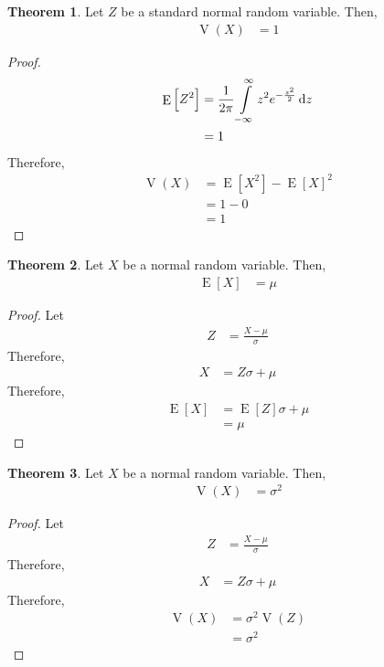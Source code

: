 \documentclass[titlepage, fleqn, a4paper, 12pt, twoside]{article}
\theoremstyle{definition}
\theoremstyle{theorem}
\newtheorem{theorem}{Theorem}
\DeclareMathOperator{\expct}{\mathrm{E}}
\DeclareMathOperator{\var}{\mathrm{V}}
\begin{document}
\begin{theorem}
	Let $Z$ be a standard normal random variable.
	Then,
	\begin{align*}
		\var(X) &= 1
	\end{align*}
\end{theorem}

\begin{proof}
	\begin{align*}
		\expct\left[ Z^2 \right] &= \frac{1}{2 \pi} \int\limits_{-\infty}^{\infty} z^2 e^{-\frac{z^2}{2}} \dif z\\
		&= 1
	\end{align*}
	Therefore,
	\begin{align*}
		\var(X) &= \expct\left[ X^2 \right] - \expct[X]^2\\
		&= 1 - 0\\
		&= 1
	\end{align*}
\end{proof}

\begin{theorem}
	Let $X$ be a normal random variable.
	Then,
	\begin{align*}
		\expct[X] &= \mu
	\end{align*}
\end{theorem}

\begin{proof}
	Let
	\begin{align*}
		Z &= \frac{X - \mu}{\sigma}
	\end{align*}
	Therefore,
	\begin{align*}
		X &= Z \sigma + \mu
	\end{align*}
	Therefore,
	\begin{align*}
		\expct[X] &= \expct[Z] \sigma + \mu\\
		&= \mu
	\end{align*}
\end{proof}

\begin{theorem}
	Let $X$ be a normal random variable.
	Then,
	\begin{align*}
		\var(X) &= \sigma^2
	\end{align*}
\end{theorem}

\begin{proof}
	Let
	\begin{align*}
		Z &= \frac{X - \mu}{\sigma}
	\end{align*}
	Therefore,
	\begin{align*}
		X &= Z \sigma + \mu
	\end{align*}
	Therefore,
	\begin{align*}
		\var(X) &= \sigma^2 \var(Z)\\
		&= \sigma^2
	\end{align*}
\end{proof}
\end{document}
